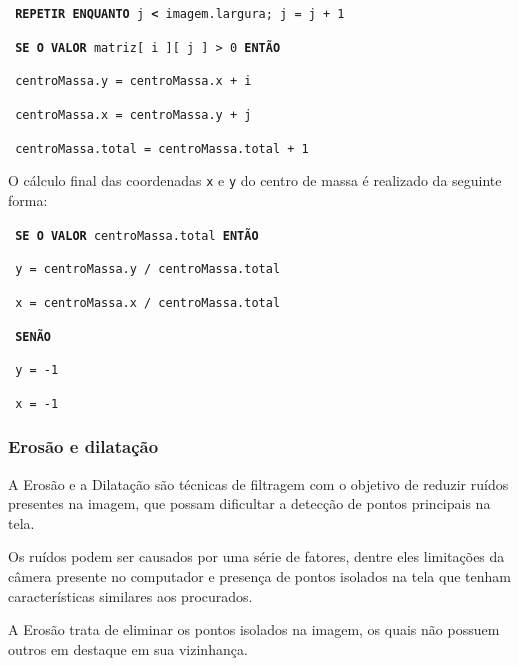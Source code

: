 \documentclass[12pt]{article}
\begin{document}
\hspace{0.2cm} \texttt{\footnotesize{ \textbf{REPETIR ENQUANTO} j \textbf{<} imagem.largura; j = j + 1}}

\hspace{0.4cm} \texttt{\footnotesize{ \textbf{SE O VALOR} matriz[ i ][ j ] > 0 \textbf{ENT\~AO} }}

\hspace{0.6cm} \texttt{\footnotesize{ centroMassa.y = centroMassa.x + i}}

\hspace{0.6cm} \texttt{\footnotesize{ centroMassa.x = centroMassa.y + j}}

\hspace{0.6cm} \texttt{\footnotesize{ centroMassa.total = centroMassa.total + 1}}


O c\'alculo final das coordenadas \texttt{x} e \texttt{y} do centro de massa \'e realizado da seguinte forma:

\hspace{0.4cm} \texttt{\footnotesize{ \textbf{SE O VALOR} centroMassa.total \textbf{ENT\~AO} }}

\hspace{0.6cm} \texttt{\footnotesize{ y = centroMassa.y / centroMassa.total}}

\hspace{0.6cm} \texttt{\footnotesize{ x = centroMassa.x / centroMassa.total}}

\hspace{0.4cm} \texttt{\footnotesize{ \textbf{SEN\~AO}}}

\hspace{0.6cm} \texttt{\footnotesize{ y = -1}}

\hspace{0.6cm} \texttt{\footnotesize{ x = -1}}

\subsubsection{Eros\~ao e dilata\c c\~ao}
A Eros\~ao e a Dilata\c c\~ao s\~ao t\'ecnicas de filtragem com o objetivo de reduzir ru\'idos presentes na imagem,
que possam dificultar a detec\c c\~ao de pontos principais na tela.

Os ru\'idos podem ser causados por uma s\'erie de fatores, dentre eles limita\c c\~oes da c\^amera presente no computador
e presen\c ca de pontos isolados na tela que tenham caracter\'isticas similares aos procurados.

A Eros\~ao trata de eliminar os pontos isolados na imagem, os quais n\~ao possuem outros em destaque em sua vizinhan\c ca.
\end{document}
